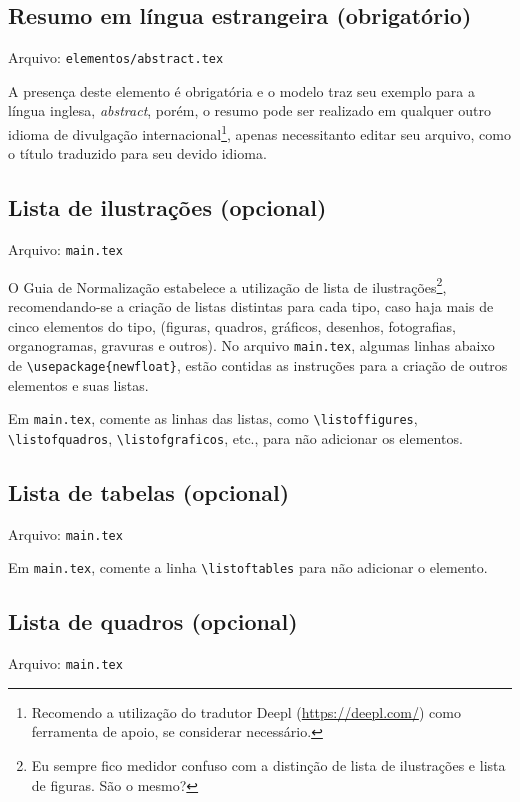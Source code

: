 \subsection{Resumo em língua estrangeira (obrigatório)}\myIdxAbstract
    Arquivo: \texttt{elementos/abstract.tex}

    A presença deste elemento é obrigatória e o modelo traz seu exemplo para a língua inglesa, \textit{abstract}, porém, o resumo pode ser realizado em qualquer outro idioma de divulgação internacional\footnote{Recomendo a utilização do tradutor Deepl (\url{https://deepl.com/}) como ferramenta de apoio, se considerar necessário.}, apenas necessitanto editar seu arquivo, como o título traduzido para seu devido idioma.

\subsection{Lista de ilustrações (opcional)}
    Arquivo: \texttt{main.tex}

    O Guia de Normalização \cite{livro:iffar-guia-normalizacao-2022} estabelece a utilização de lista de ilustrações\footnote{Eu sempre fico medidor confuso com a distinção de lista de ilustrações e lista de figuras. São o mesmo?}, recomendando-se a criação de listas distintas para cada tipo, caso haja mais de cinco elementos do tipo, (figuras, quadros, gráficos, desenhos, fotografias, organogramas, gravuras e outros). No arquivo \texttt{main.tex}, algumas linhas abaixo de \verb|\usepackage{newfloat}|, estão contidas as instruções para a criação de outros elementos e suas listas.

    Em \texttt{main.tex}, comente as linhas das listas, como \verb|\listoffigures|, \\\verb|\listofquadros|, \verb|\listofgraficos|, etc., para não adicionar os elementos.

\subsection{Lista de tabelas (opcional)}
    Arquivo: \texttt{main.tex}

    Em \texttt{main.tex}, comente a linha \verb|\listoftables| para não adicionar o elemento.

\subsection{Lista de quadros (opcional)}
    Arquivo: \texttt{main.tex}

